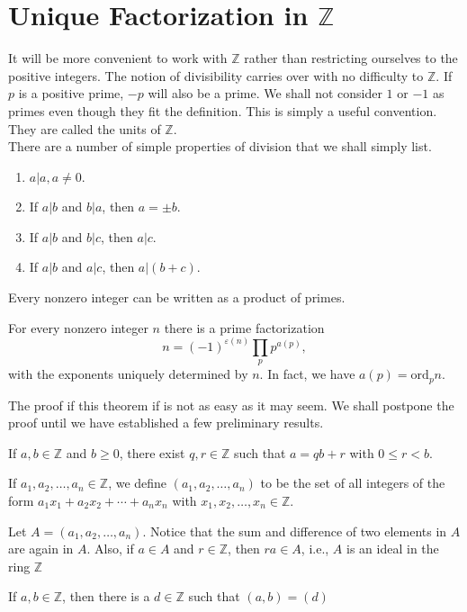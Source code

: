 \documentclass{mynotes}
\begin{document}
\section{Unique Factorization in $\mathbb{Z}$}
It will be more convenient to work with $\mathbb{Z}$ rather than restricting ourselves to the positive integers. The notion of divisibility carries over with no difficulty to $\mathbb{Z}$. If $p$ is a positive prime, $-p$ will also be a prime. We shall not consider $1$ or $-1$ as primes even though they fit the definition. This is simply a useful convention. They are called the units of $\mathbb{Z}$.\\There are a number of simple properties of division that we shall simply list.
\begin{enumerate}
\item $a|a,a\neq0$.
\item If $a|b$ and $b|a$, then $a=\pm b$.
\item If $a|b$ and $b|c$, then $a|c$.
\item If $a|b$ and $a|c$, then $a|(b+c)$.
\end{enumerate}
\begin{lemma}
Every nonzero integer can be written as a product of primes.
\end{lemma}
\begin{theorem}
For every nonzero integer $n$ there is a prime factorization$$n=(-1)^{\varepsilon(n)}\prod_pp^{a(p)},$$with the exponents uniquely determined by $n$. In fact, we have $a(p)=\mbox{ord}_pn$.
\end{theorem}
The proof if this theorem if is not as easy as it may seem. We shall postpone the proof until we have established a few preliminary results.
\begin{lemma}
If $a,b\in\mathbb{Z}$ and $b\ge0$, there exist $q,r\in\mathbb{Z}$ such that $a=qb+r$ with $0\leq r<b$.
\end{lemma}
\begin{definition}
If $a_1,a_2,\ldots,a_n\in\mathbb{Z}$, we define $(a_1,a_2,\ldots,a_n)$ to be the set of all integers of the form $a_1x_1+a_2x_2+\cdots+a_nx_n$ with $x_1,x_2,\ldots,x_n\in\mathbb{Z}$.
\end{definition}
\begin{remark}
Let $A = (a_1,a_2,\ldots,a_n)$. Notice that the sum and difference of two elements in $A$ are again in $A$. Also, if $a\in A$ and $r\in\mathbb{Z}$, then $ra\in A$, i.e., $A$ is an ideal in the ring $\mathbb{Z}$
\end{remark}
\begin{lemma}
If $a,b\in \mathbb{Z}$, then there is a $d\in \mathbb{Z}$ such that $(a, b)=(d)$
\end{lemma}
\end{document}
